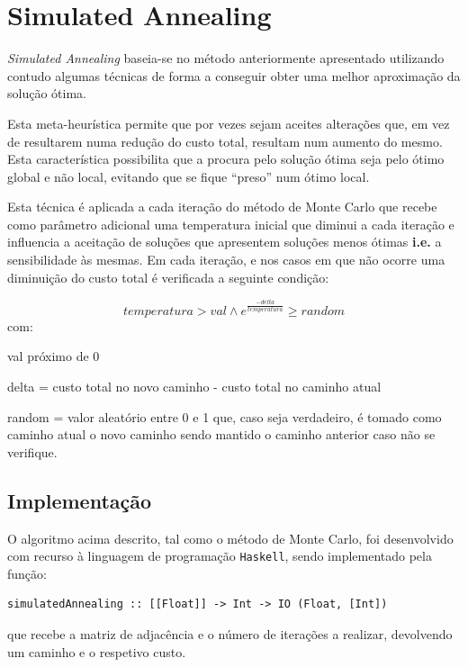 \documentclass{article}
\begin{document}
\section{Simulated Annealing}

\textit{Simulated Annealing} baseia-se no método anteriormente apresentado utilizando contudo algumas técnicas de forma a conseguir obter uma melhor aproximação da solução ótima.

Esta meta-heurística permite que por vezes sejam aceites alterações que, em vez de resultarem numa redução do custo total, resultam num aumento do mesmo. Esta característica possibilita que a procura pelo solução ótima seja pelo ótimo global e não local, evitando que se fique ``preso'' num ótimo local.

Esta técnica é aplicada a cada iteração do método de Monte Carlo que recebe como parâmetro adicional uma temperatura inicial que diminui a cada iteração e influencia a aceitação de soluções que apresentem soluções menos ótimas \textbf{i.e.} a sensibilidade às mesmas. Em cada iteração, e nos casos em que não ocorre uma diminuição do custo total é verificada a seguinte condição:

\begin{equation}\label{eq:sa}
temperatura > val \land e^{\frac{-delta}{temperatura}} \ge random 
\end{equation}
\hspace{4cm} com:

\hspace{4.5cm} val próximo de 0

\hspace{4.5cm} delta = custo total no novo caminho - custo total no caminho atual

\hspace{4.5cm} random = valor aleatório entre 0 e 1
\newline\newline
que, caso seja verdadeiro, é tomado como caminho atual o novo caminho sendo mantido o caminho anterior caso não se verifique.

\subsection{Implementação}

O algoritmo acima descrito, tal como o método de Monte Carlo, foi desenvolvido com recurso à linguagem de programação \texttt{Haskell}, sendo implementado pela função:
\begin{verbatim}
simulatedAnnealing :: [[Float]] -> Int -> IO (Float, [Int])
\end{verbatim}
que recebe a matriz de adjacência e o número de iterações a realizar, devolvendo um caminho e o respetivo custo.
\end{document}
